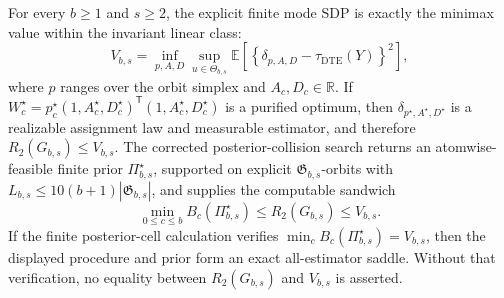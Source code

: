 For every \(b\ge1\) and \(s\ge2\), the explicit finite mode SDP is exactly the minimax value within the invariant linear class:
\[
V_{b,s}=
\inf_{p,A,D}\sup_{u\in\Theta_{b,s}}
\mathbb E\!\left[\left\{\delta_{p,A,D}-\tau_{\mathrm{DTE}}(Y)\right\}^2\right],
\]
where \(p\) ranges over the orbit simplex and \(A_c,D_c\in\mathbb R\).  If \(W_c^{\star}=p_c^{\star}(1,A_c^{\star},D_c^{\star})^{\mathsf T}(1,A_c^{\star},D_c^{\star})\) is a purified optimum, then \(\delta_{p^{\star},A^{\star},D^{\star}}\) is a realizable assignment law and measurable estimator, and therefore \(R_2(G_{b,s})\le V_{b,s}\).  The corrected posterior-collision search returns an atomwise-feasible finite prior \(\Pi_{b,s}^{\star}\), supported on explicit \(\mathfrak G_{b,s}\)-orbits with \(L_{b,s}\le10(b+1)|\mathfrak G_{b,s}|\), and supplies the computable sandwich
\[
\min_{0\le c\le b}B_c(\Pi_{b,s}^{\star})
\le R_2(G_{b,s})\le V_{b,s}.
\]
If the finite posterior-cell calculation verifies \(\min_cB_c(\Pi_{b,s}^{\star})=V_{b,s}\), then the displayed procedure and prior form an exact all-estimator saddle.  Without that verification, no equality between \(R_2(G_{b,s})\) and \(V_{b,s}\) is asserted.